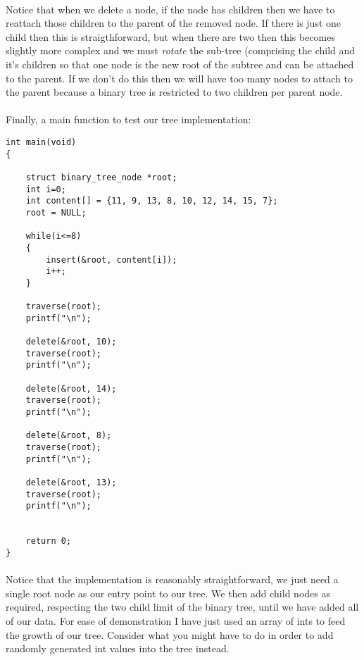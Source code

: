 \documentclass[10pt, a4paper, twosize]{article}
\begin{document}
\paragraph{} Notice that when we delete a node, if the node has children then we have to reattach those children to the parent of the removed node. If there is just one child then this is straigthforward, but when there are two then this becomes slightly more complex and we must \emph{rotate} the sub-tree (comprising the child and it's children so that one node is the new root of the subtree and can be attached to the parent. If we don't do this then we will have too many nodes to attach to the parent because a binary tree is restricted to two children per parent node.


\paragraph{} Finally, a main function to test our tree implementation:
\begin{lstlisting}
int main(void)
{

    struct binary_tree_node *root;
    int i=0;
    int content[] = {11, 9, 13, 8, 10, 12, 14, 15, 7};
    root = NULL;

    while(i<=8)
    {
        insert(&root, content[i]);
        i++;
    }
    
    traverse(root);
    printf("\n");

    delete(&root, 10);
    traverse(root);
    printf("\n");

    delete(&root, 14);
    traverse(root);
    printf("\n");

    delete(&root, 8);
    traverse(root);
    printf("\n");

    delete(&root, 13);
    traverse(root);
    printf("\n");


    return 0;
}
\end{lstlisting}
\paragraph{} Notice that the implementation is reasonably straightforward, we just need a single root node as our entry point to our tree. We then add child nodes as required, respecting the two child limit of the binary tree, until we have added all of our data. For ease of demonstration I have just used an array of ints to feed the growth of our tree. Consider what you might have to do in order to add randomly generated int values into the tree instead.
\end{document}
